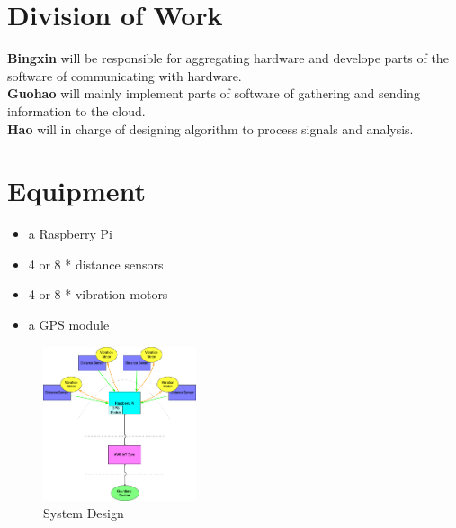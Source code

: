 \documentclass{article}
\begin{document}
    \begin{multicols}{2}
    \section{Division of Work}
        \textbf{Bingxin} will be responsible for aggregating hardware and develope parts of the software of communicating with hardware.\\
        \textbf{Guohao} will mainly implement parts of software of gathering and sending information to the cloud.\\
        \textbf{Hao} will in charge of designing algorithm to process signals and analysis.

    \section{Equipment}
        \begin{itemize}
            \item a Raspberry Pi
            \item 4 or 8 * distance sensors
            \item 4 or 8 * vibration motors
            \item a GPS module
        \end{itemize}

    \begin{figure}[H]
        \centering
        \includegraphics[width=0.4\textwidth]{cse520s_proposal_fig1.jpg}
        \caption{System Design}
    \end{figure}
    \end{multicols}
\end{document}
